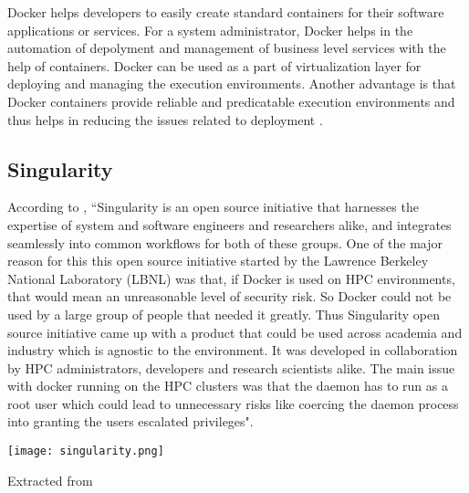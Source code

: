 Docker helps developers to easily create standard containers for their software applications or services. For a system administrator, Docker helps in the automation of depolyment and management of business level services with the help of containers. Docker can be used as a part of virtualization layer for deploying and managing the execution environments. Another advantage is that Docker containers provide reliable and predicatable execution environments and thus helps in reducing the issues related to deployment \cite{DBLP:journals/corr/MorrisVHM17}.

\subsection{Singularity}
According to \cite{10.1371/journal.pone.0177459}, ``Singularity is an open source initiative that harnesses the expertise of system and software engineers and researchers alike, and integrates seamlessly into common workflows for both of these groups. One of the major reason for this this open source initiative started by the Lawrence Berkeley National Laboratory (LBNL) was that, if Docker is used on HPC environments, that would mean an unreasonable level of security risk. So Docker could not be used by a large group of people that needed it greatly. Thus Singularity open source initiative came up with a product that could be used across academia and industry which is agnostic to the environment. It was developed in collaboration by HPC administrators, developers and research scientists alike. The main issue with docker running on the HPC clusters was that the daemon has to run as a root user which could lead to unnecessary risks like coercing the daemon process into granting the users escalated privileges".

\begin{center}
\texttt{[image: singularity.png]}
\label{fig:singularity_workflow}
\caption*{Extracted from \cite{10.1371/journal.pone.0177459}}
\end{center}

